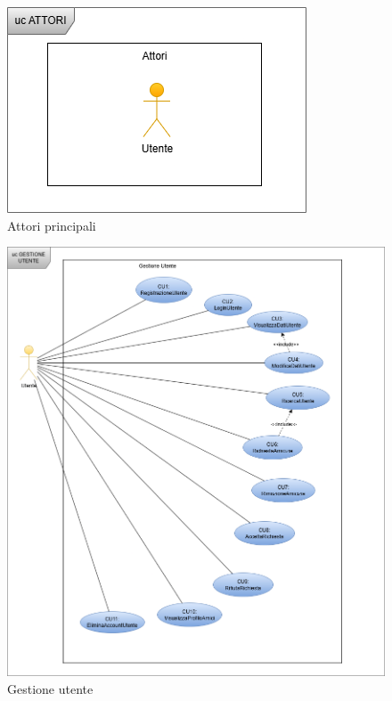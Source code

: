 \documentclass{article}
\begin{document}
\begin{figure}[H]
  \centering
  \includegraphics[width=.6\linewidth]{cu_attori.png}
  \caption{Attori principali}
  \label{fig:sitemap}
\end{figure}

\begin{figure}[H]
  \centering
  \includegraphics[width=1\linewidth]{cu_utente.png}
  \caption{Gestione utente}
  \label{fig:sitemap}
\end{figure}
\end{document}
